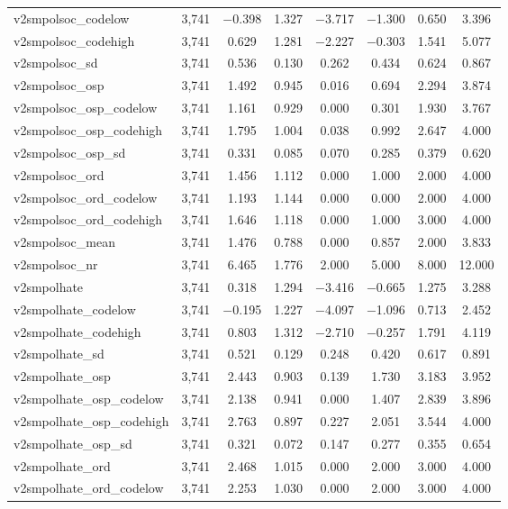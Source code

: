 \begin{table}[!htbp]
\begin{tabular}{@{\extracolsep{5pt}}lccccccc}
v2smpolsoc\_codelow & 3,741 & $-$0.398 & 1.327 & $-$3.717 & $-$1.300 & 0.650 & 3.396 \\ 
v2smpolsoc\_codehigh & 3,741 & 0.629 & 1.281 & $-$2.227 & $-$0.303 & 1.541 & 5.077 \\ 
v2smpolsoc\_sd & 3,741 & 0.536 & 0.130 & 0.262 & 0.434 & 0.624 & 0.867 \\ 
v2smpolsoc\_osp & 3,741 & 1.492 & 0.945 & 0.016 & 0.694 & 2.294 & 3.874 \\ 
v2smpolsoc\_osp\_codelow & 3,741 & 1.161 & 0.929 & 0.000 & 0.301 & 1.930 & 3.767 \\ 
v2smpolsoc\_osp\_codehigh & 3,741 & 1.795 & 1.004 & 0.038 & 0.992 & 2.647 & 4.000 \\ 
v2smpolsoc\_osp\_sd & 3,741 & 0.331 & 0.085 & 0.070 & 0.285 & 0.379 & 0.620 \\ 
v2smpolsoc\_ord & 3,741 & 1.456 & 1.112 & 0.000 & 1.000 & 2.000 & 4.000 \\ 
v2smpolsoc\_ord\_codelow & 3,741 & 1.193 & 1.144 & 0.000 & 0.000 & 2.000 & 4.000 \\ 
v2smpolsoc\_ord\_codehigh & 3,741 & 1.646 & 1.118 & 0.000 & 1.000 & 3.000 & 4.000 \\ 
v2smpolsoc\_mean & 3,741 & 1.476 & 0.788 & 0.000 & 0.857 & 2.000 & 3.833 \\ 
v2smpolsoc\_nr & 3,741 & 6.465 & 1.776 & 2.000 & 5.000 & 8.000 & 12.000 \\ 
v2smpolhate & 3,741 & 0.318 & 1.294 & $-$3.416 & $-$0.665 & 1.275 & 3.288 \\ 
v2smpolhate\_codelow & 3,741 & $-$0.195 & 1.227 & $-$4.097 & $-$1.096 & 0.713 & 2.452 \\ 
v2smpolhate\_codehigh & 3,741 & 0.803 & 1.312 & $-$2.710 & $-$0.257 & 1.791 & 4.119 \\ 
v2smpolhate\_sd & 3,741 & 0.521 & 0.129 & 0.248 & 0.420 & 0.617 & 0.891 \\ 
v2smpolhate\_osp & 3,741 & 2.443 & 0.903 & 0.139 & 1.730 & 3.183 & 3.952 \\ 
v2smpolhate\_osp\_codelow & 3,741 & 2.138 & 0.941 & 0.000 & 1.407 & 2.839 & 3.896 \\ 
v2smpolhate\_osp\_codehigh & 3,741 & 2.763 & 0.897 & 0.227 & 2.051 & 3.544 & 4.000 \\ 
v2smpolhate\_osp\_sd & 3,741 & 0.321 & 0.072 & 0.147 & 0.277 & 0.355 & 0.654 \\ 
v2smpolhate\_ord & 3,741 & 2.468 & 1.015 & 0.000 & 2.000 & 3.000 & 4.000 \\ 
v2smpolhate\_ord\_codelow & 3,741 & 2.253 & 1.030 & 0.000 & 2.000 & 3.000 & 4.000 \\ 

\end{tabular}
\end{table}
